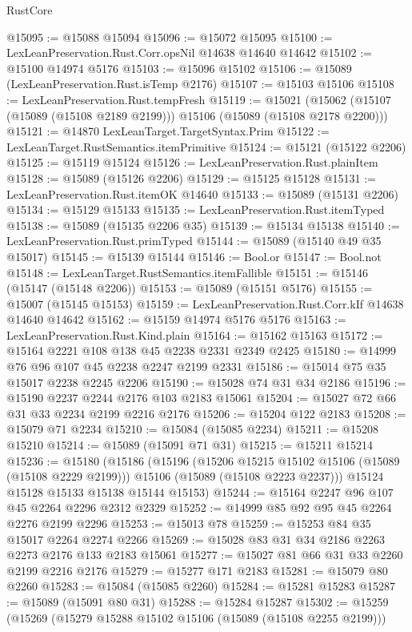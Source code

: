 \begin{lexlean}{RustCore}
\begin{coremodule}
@15095 := @15088 @15094
@15096 := @15072 @15095
@15100 := LexLeanPreservation.Rust.Corr.opsNil @14638 @14640 @14642
@15102 := @15100 @14974 @5176
@15103 := @15096 @15102
@15106 := @15089 (LexLeanPreservation.Rust.isTemp @2176)
@15107 := @15103 @15106
@15108 := LexLeanPreservation.Rust.tempFresh
@15119 := @15021
    (@15062 (@15107 (@15089 (@15108 @2189 @2199))) @15106 (@15089 (@15108 @2178 @2200)))
@15121 := @14870 LexLeanTarget.TargetSyntax.Prim
@15122 := LexLeanTarget.RustSemantics.itemPrimitive
@15124 := @15121 (@15122 @2206)
@15125 := @15119 @15124
@15126 := LexLeanPreservation.Rust.plainItem
@15128 := @15089 (@15126 @2206)
@15129 := @15125 @15128
@15131 := LexLeanPreservation.Rust.itemOK @14640
@15133 := @15089 (@15131 @2206)
@15134 := @15129 @15133
@15135 := LexLeanPreservation.Rust.itemTyped
@15138 := @15089 (@15135 @2206 @35)
@15139 := @15134 @15138
@15140 := LexLeanPreservation.Rust.primTyped
@15144 := @15089 (@15140 @49 @35 @15017)
@15145 := @15139 @15144
@15146 := Bool.or
@15147 := Bool.not
@15148 := LexLeanTarget.RustSemantics.itemFallible
@15151 := @15146 (@15147 (@15148 @2206))
@15153 := @15089 (@15151 @5176)
@15155 := @15007 (@15145 @15153)
@15159 := LexLeanPreservation.Rust.Corr.kIf @14638 @14640 @14642
@15162 := @15159 @14974 @5176 @5176
@15163 := LexLeanPreservation.Rust.Kind.plain
@15164 := @15162 @15163
@15172 := @15164 @2221 @108 @138 @45 @2238 @2331 @2349 @2425
@15180 := @14999 @76 @96 @107 @45 @2238 @2247 @2199 @2331
@15186 := @15014 @75 @35 @15017 @2238 @2245 @2206
@15190 := @15028 @74 @31 @34 @2186
@15196 := @15190 @2237 @2244 @2176 @103 @2183 @15061
@15204 := @15027 @72 @66 @31 @33 @2234 @2199 @2216 @2176
@15206 := @15204 @122 @2183
@15208 := @15079 @71 @2234
@15210 := @15084 (@15085 @2234)
@15211 := @15208 @15210
@15214 := @15089 (@15091 @71 @31)
@15215 := @15211 @15214
@15236 := @15180
    (@15186
      (@15196
        (@15206 @15215 @15102 @15106 (@15089 (@15108 @2229 @2199)))
        @15106
        (@15089 (@15108 @2223 @2237)))
      @15124
      @15128
      @15133
      @15138
      @15144
      @15153)
@15244 := @15164 @2247 @96 @107 @45 @2264 @2296 @2312 @2329
@15252 := @14999 @85 @92 @95 @45 @2264 @2276 @2199 @2296
@15253 := @15013 @78
@15259 := @15253 @84 @35 @15017 @2264 @2274 @2266
@15269 := @15028 @83 @31 @34 @2186 @2263 @2273 @2176 @133 @2183 @15061
@15277 := @15027 @81 @66 @31 @33 @2260 @2199 @2216 @2176
@15279 := @15277 @171 @2183
@15281 := @15079 @80 @2260
@15283 := @15084 (@15085 @2260)
@15284 := @15281 @15283
@15287 := @15089 (@15091 @80 @31)
@15288 := @15284 @15287
@15302 := @15259
    (@15269
      (@15279 @15288 @15102 @15106 (@15089 (@15108 @2255 @2199)))

\end{coremodule}
\end{lexlean}
